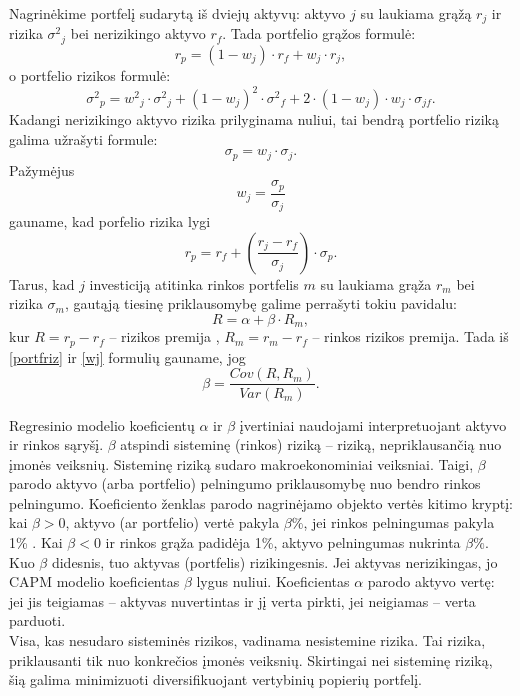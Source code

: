 \documentclass[12pt, a14paper, lithuanian]{article}
\begin{document}
Nagrinėkime portfelį sudarytą iš dviejų aktyvų: aktyvo $ j $ su laukiama grąžą $ r_j $ ir rizika $ {{\sigma}^2}_j $ bei nerizikingo aktyvo $r_f$. Tada portfelio grąžos formulė: 
$$ r_p = (1-w_j) \cdot r_f + w_j \cdot r_j, $$ 
o portfelio rizikos formulė: 
\begin{equation}  
{{\sigma}^2}_p = {{w^2}_j} \cdot {{\sigma}^2}_j + (1- w_j)^2 \cdot {{\sigma}^2}_f + 2 \cdot (1-w_j) \cdot w_j \cdot {\sigma}_{jf} .
\label{portfriz}
\end{equation}
 Kadangi nerizikingo aktyvo rizika prilyginama nuliui, tai bendrą portfelio riziką galima užrašyti formule: $$ {\sigma}_p = w_j \cdot {\sigma}_j . $$ Pažymėjus 
 \begin{equation} 
  w_j = \frac{{\sigma}_p}{ {\sigma}_j} 
  \label{wj}
  \end{equation} gauname, kad porfelio rizika lygi $$ r_p = r_f + \left( \frac{r_j - r_f}{{\sigma}_j} \right) \cdot {\sigma }_p. $$ Tarus, kad $j$ investiciją atitinka rinkos portfelis $m$ su laukiama grąža $r_m$ bei rizika ${\sigma}_m$, gautąją tiesinę priklausomybę galime perrašyti tokiu pavidalu: 
$$ R = \alpha  + \beta  \cdot R_m, $$ kur $ R = r_p - r_f$ -- rizikos premija , $ R_m = r_m - r_f$ -- rinkos rizikos premija. Tada iš \eqref{portfriz} ir \eqref{wj} formulių gauname, jog $$ \beta = \frac{Cov (R, R_m)} { Var (R_m) } . $$

Regresinio modelio koeficientų $ \alpha $ ir $ \beta $ įvertiniai naudojami interpretuojant aktyvo ir rinkos sąryšį. $ \beta $ atspindi sisteminę (rinkos) riziką -- riziką, nepriklausančią nuo įmonės veiksnių. Sisteminę riziką sudaro makroekonominiai veiksniai. Taigi, $ \beta $ parodo aktyvo (arba portfelio) pelningumo priklausomybę nuo bendro rinkos pelningumo. Koeficiento ženklas parodo nagrinėjamo objekto vertės kitimo kryptį: kai $ \beta > 0 $, aktyvo (ar portfelio) vertė pakyla $\beta \%$, jei rinkos pelningumas pakyla 1\% \cite{capm}. Kai $ \beta < 0 $ ir rinkos grąža padidėja 1\%, aktyvo pelningumas nukrinta $\beta \%$. Kuo $ \beta $  didesnis, tuo aktyvas (portfelis) rizikingesnis. Jei aktyvas nerizikingas, jo CAPM modelio koeficientas $ \beta $ lygus nuliui. Koeficientas $ \alpha $ parodo aktyvo vertę: jei jis teigiamas -- aktyvas nuvertintas ir jį verta pirkti, jei neigiamas -- verta parduoti.\\

Visa, kas nesudaro sisteminės rizikos, vadinama nesistemine rizika. Tai rizika, priklausanti tik nuo konkrečios įmonės veiksnių. Skirtingai nei sisteminę riziką, šią galima minimizuoti diversifikuojant vertybinių popierių portfelį.\\
\end{document}
